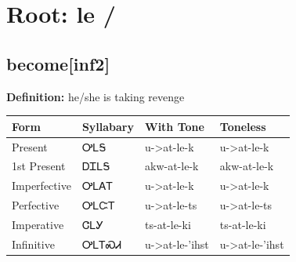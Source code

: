 \documentclass{article}%
\begin{document}
%
\normalsize%
\section*{Root: le / }%
\subsection*{become[inf2]}%
\textbf{Definition: }%
he/she is taking revenge%
\\[0.5em]%
\begin{tabular}{|l|l|l|l|}%
\hline%
\textbf{Form}&\textbf{Syllabary}&\textbf{With Tone}&\textbf{Toneless}\\%
\hline%
Present&ᎤᏞᎦ&u{-}>at{-}le{-}k&u{-}>at{-}le{-}k\\%
1st Present&ᎠᏆᏞᎦ&akw{-}at{-}le{-}k&akw{-}at{-}le{-}k\\%
Imperfective&ᎤᏞᎪᎢ&u{-}>at{-}le{-}k&u{-}>at{-}le{-}k\\%
Perfective&ᎤᏞᏨᎢ&u{-}>at{-}le{-}ts&u{-}>at{-}le{-}ts\\%
Imperative&ᏣᏞᎩ&ts{-}at{-}le{-}ki&ts{-}at{-}le{-}ki\\%
Infinitive&ᎤᏞᎢᏍᏗ&u{-}>at{-}le{-}'ihst&u{-}>at{-}le{-}'ihst\\%
\hline%
\end{tabular}%
\\[1em]%
\end{document}
